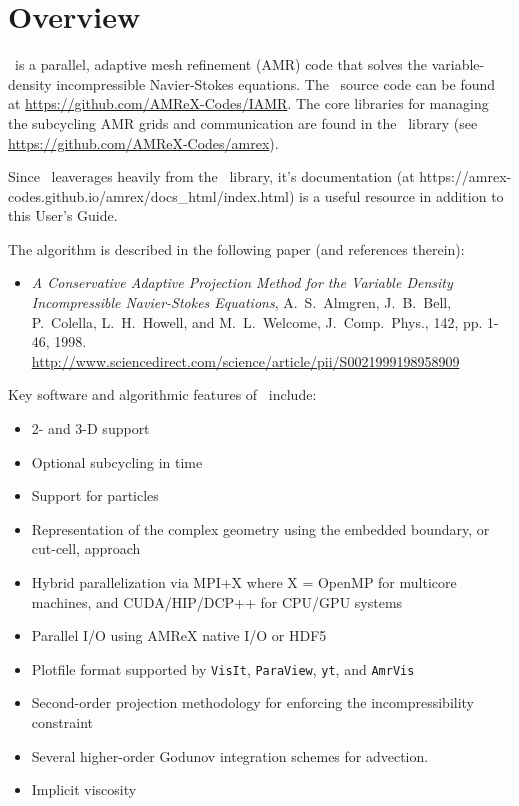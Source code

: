 \section{Overview}

\iamr\ is a parallel, adaptive mesh refinement (AMR) code that 
solves the variable-density incompressible Navier-Stokes equations.
The \iamr\ source code can be found at
\url{https://github.com/AMReX-Codes/IAMR}.
The core libraries for managing the subcycling AMR
grids and communication are found in the \amrex\ library
(see \url{https://github.com/AMReX-Codes/amrex}).

Since \iamr\ leaverages heavily from the \amrex\ library,
it's documentation (at https://amrex-codes.github.io/amrex/docs\_html/index.html)
is a useful resource in addition to this User's Guide.

The algorithm is described in the following paper (and references therein):
\begin{itemize}

\item {\it A Conservative Adaptive Projection Method for the Variable Density Incompressible Navier-Stokes Equations},
A.~S.~Almgren, J.~B.~Bell, P.~Colella, L.~H.~Howell, and M.~L.~Welcome,
J.~Comp.~Phys., 142, pp. 1-46, 1998.
\url{http://www.sciencedirect.com/science/article/pii/S0021999198958909} \cite{IAMR}

\end{itemize}  

Key software and algorithmic features of \iamr\ include:
\begin{itemize}
\item 2- and 3-D support
\item Optional subcycling in time
\item Support for particles
\item Representation of the complex geometry using the embedded boundary, or cut-cell, approach
\item Hybrid parallelization via MPI+X where X = OpenMP for multicore machines, and CUDA/HIP/DCP++ for CPU/GPU systems
\item Parallel I/O using AMReX native I/O or HDF5
\item Plotfile format supported by {\tt VisIt}, {\tt ParaView}, {\tt yt}, and {\tt AmrVis}
\item Second-order projection methodology for enforcing the incompressibility constraint
\item Several higher-order Godunov integration schemes for advection.
\item Implicit viscosity
\end{itemize}

